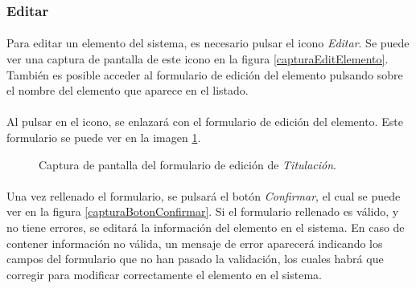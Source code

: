 \subsubsection{Editar}

  \paragraph{}Para editar un elemento del sistema, es necesario pulsar el
  icono \textit{Editar}. Se puede ver una captura de pantalla de este
  icono en la figura \ref{capturaEditElemento}. También es posible acceder
  al formulario de edición del elemento pulsando sobre el nombre del elemento
  que aparece en el listado.

  \paragraph{}Al pulsar en el icono, se enlazará con el formulario de edición
  del elemento. Este formulario se puede ver en la imagen
  \ref{capturaEditTitulacion}.

  \begin{figure}[!ht]
    \begin{center}
      \caption{Captura de pantalla del formulario de edición de \textit{Titulación}.}
      \label{capturaEditTitulacion}
    \end{center}
  \end{figure}

  \paragraph{}Una vez rellenado el formulario, se pulsará el botón
  \textit{Confirmar}, el cual se puede ver en la figura
  \ref{capturaBotonConfirmar}. Si el formulario rellenado es válido, y no tiene
  errores, se editará la información del elemento en el sistema. En caso de
  contener información no válida, un mensaje de error aparecerá indicando los
  campos del formulario que no han pasado la validación, los cuales habrá que
  corregir para modificar correctamente el elemento en el sistema.
